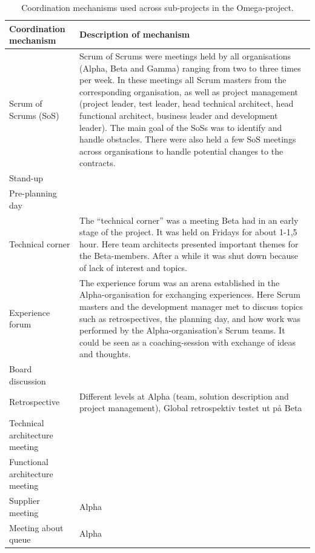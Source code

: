 \begin{table}[H]
\begin{center}
    \begin{tabular}{| p{6cm} | p{9cm} |}
    \hline
    \textbf{Coordination mechanism} & \textbf{Description of mechanism} \\ \hline
    Scrum of Scrums (SoS) & Scrum of Scrums were meetings held by all organisations (Alpha, Beta and Gamma) ranging from two to three times per week. In these meetings all Scrum masters from the corresponding organisation, as well as project management (project leader, test leader, head technical architect, head functional architect, business leader and development leader). The main goal of the SoSs was to identify and handle obstacles. There were also held a few SoS meetings across organisations to handle potential changes to the contracts. \\ \hline
    Stand-up &  \\ \hline
    Pre-planning day & \\ \hline
    Technical corner & The ``technical corner'' was a meeting Beta had in an early stage of the project. It was held on Fridays for about 1-1,5 hour. Here team architects presented important themes for the Beta-members. After a while it was shut down because of lack of interest and topics. \\ \hline
    Experience forum & The experience forum was an arena established in the Alpha-organisation for exchanging experiences. Here Scrum masters and the development manager met to discuss topics such as retrospectives, the planning day, and how work was performed by the Alpha-organisation's Scrum teams. It could be seen as a coaching-session with exchange of ideas and thoughts. \\ \hline
    Board discussion & \\ \hline
    Retrospective & Different levels at Alpha (team, solution description and project management), Global retrospektiv testet ut på Beta \\ \hline
    Technical architecture meeting & \\ \hline
    Functional architecture meeting & \\ \hline
    Supplier meeting & Alpha \\ \hline
    Meeting about queue & Alpha \\ \hline
    \end{tabular}
    \caption{Coordination mechanisms used across sub-projects in the Omega-project.}
    \label{cmuasito}
\end{center}
\end{table}

